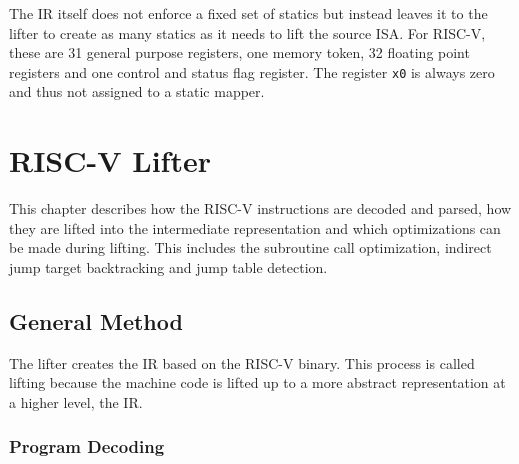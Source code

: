 \documentclass[course=eragp]{aspdoc}
\begin{document}
\par

The IR itself does not enforce a fixed set of statics but instead leaves it to the lifter to
create as many statics as it needs to lift the source ISA.
For RISC-V, these are 31 general purpose registers, one memory token, 32 floating point registers
and one control and status flag register. The register \texttt{x0} is always zero and thus not
assigned to a static mapper.

\section{RISC-V Lifter}\label{sec:riscv_lifter}

This chapter describes how the RISC-V instructions are decoded and parsed, how they are lifted
into the intermediate representation and which optimizations can be made during lifting. This
includes the subroutine call optimization, indirect jump target backtracking and jump table detection.

\subsection{General Method}



The lifter creates the IR based on the RISC-V binary. This process is called lifting because the
machine code is lifted up to a more abstract representation at a higher level, the IR.

\subsubsection{Program Decoding}\label{sec:program_decoding}
\end{document}
